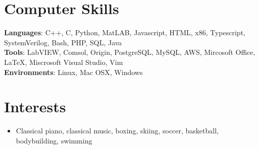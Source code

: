 \documentclass[hidelinks,letterpaper,11pt]{article} %
\newcommand{\resumeSubHeadingListStart}{\begin{itemize}[leftmargin=*]}
\newcommand{\resumeSubHeadingListEnd}{\end{itemize}}
\begin{document}
\section{Computer Skills}
\small{ \textbf{Languages}: C++, C, Python, MatLAB, Javascript, HTML, x86, Typescript, SystemVerilog, Bash, PHP, SQL, Java} \\
\small{ \textbf{Tools}: LabVIEW, Comsol, Origin, PostgreSQL, MySQL, AWS, Mircosoft Office, LaTeX, Miscrosoft Visual Studio, Vim} \\
\small{ \textbf{Environments}: Linux, Mac OSX, Windows} \\ \vspace{-2pt}

\section{Interests}
  \resumeSubHeadingListStart
      \item\small{
        {Classical piano, classical music, boxing, skiing, soccer, basketball, bodybuilding, swimming \vspace{-2pt}}
      }
  \resumeSubHeadingListEnd

%


\end{document}
